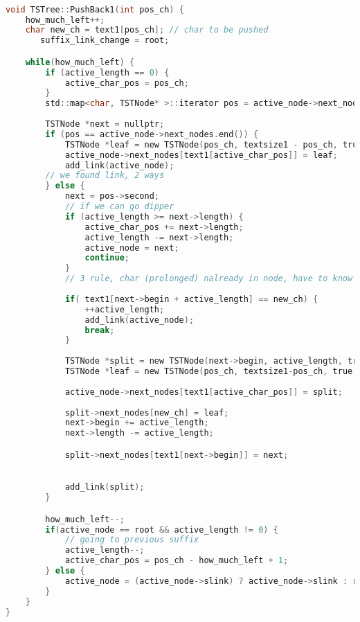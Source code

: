 \begin{lstlisting}[language=C]

void TSTree::PushBack1(int pos_ch) {
    how_much_left++;
    char new_ch = text1[pos_ch]; // char to be pushed
       suffix_link_change = root; 

    while(how_much_left) {
        if (active_length == 0) {
            active_char_pos = pos_ch;
        }
        std::map<char, TSTNode* >::iterator pos = active_node->next_nodes.find(text1[active_char_pos]);
         
        TSTNode *next = nullptr;
        if (pos == active_node->next_nodes.end()) {
            TSTNode *leaf = new TSTNode(pos_ch, textsize1 - pos_ch, true,false); 
            active_node->next_nodes[text1[active_char_pos]] = leaf;
            add_link(active_node);
        // we found link, 2 ways    
        } else {
            next = pos->second;
            // if we can go dipper 
            if (active_length >= next->length) {
                active_char_pos += next->length;
                active_length -= next->length;
                active_node = next;
                continue;
            }
            // 3 rule, char (prolonged) nalready in node, have to know nex, false, truet
            
            if( text1[next->begin + active_length] == new_ch) { 
                ++active_length;
                add_link(active_node);
                break;
            }
            
            TSTNode *split = new TSTNode(next->begin, active_length, true, false);
            TSTNode *leaf = new TSTNode(pos_ch, textsize1-pos_ch, true, false);
            
            active_node->next_nodes[text1[active_char_pos]] = split;
            
            split->next_nodes[new_ch] = leaf;
            next->begin += active_length;
            next->length -= active_length;

            split->next_nodes[text1[next->begin]] = next;
           

            add_link(split);
        }

        how_much_left--;
        if(active_node == root && active_length != 0) {
            // going to previous suffix
            active_length--;
            active_char_pos = pos_ch - how_much_left + 1;            
        } else {
            active_node = (active_node->slink) ? active_node->slink : root;
        }
    }
}


\end{lstlisting}
